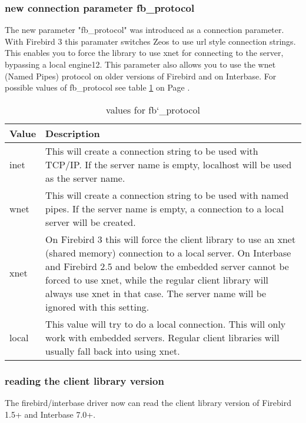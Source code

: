 \documentclass[a4paper,12pt,oneside]{book}
\begin{document}
\subsubsection{new connection parameter fb\_protocol}
\label{sec:Rev6_FirebirdInterbase_Changes_FBProtocol}

The new parameter "fb\_protocol" was introduced as a connection parameter.
With Firebird 3 this paramater switches Zeos to use url style connection strings.
This enables you to force the library to use xnet for connecting to the server, bypassing a local engine12.
This parameter also allows you to use the wnet (Named Pipes) protocol on older versions of Firebird and on Interbase.
For possible values of fb\_protocol see table \ref{tbl:Rev6_ValuesFbprotocol} on Page \pageref{tbl:Rev6_ValuesFbprotocol}.

\begin{table}
    \begin{tabular}{ p{1cm} p{13cm} }
    Value & Description \\ \hline
    inet & This will create a connection string to be used with TCP/IP. If the server name is empty, localhost will be used as the server name. \\ %
    wnet & This will create a connection string to be used with named pipes. If the server name is empty, a connection to a local server will be created. \\ %
    xnet & On Firebird 3 this will force the client library to use an xnet (shared memory) connection to a local server. On Interbase and Firebird 2.5 and below the embedded server cannot be forced to use xnet, while the regular client library will always use xnet in that case. The server name will be ignored with this setting. \\
    local & This value will try to do a local connection. This will only work with embedded servers. Regular client libraries will usually fall back into using xnet. \\
		\end{tabular}
    \caption{values for fb\char`_protocol}
    \label{tbl:Rev6_ValuesFbprotocol}
\end{table}

\subsubsection{reading the client library version}
\label{sec:Rev6_FirebirdInterbase_Changes_ReadingLibraryVersion}

The firebird/interbase driver now can read the client library version of Firebird 1.5+ and Interbase 7.0+.
\end{document}
